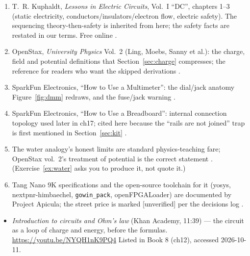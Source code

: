 \chapternotes

\begin{enumerate}
\item T.~R. Kuphaldt, \emph{Lessons in Electric Circuits}, Vol.~I ``DC'',
chapters 1--3 (static electricity, conductors/insulators/electron flow,
electric safety). The sequencing theory-then-safety is inherited from here;
the safety facts are restated in our terms. Free online
\cite{aacvol1}.
\item OpenStax, \emph{University Physics} Vol.~2 (Ling, Moebs, Sanny et
al.): the charge, field and potential definitions that
Section~\ref{sec:charge} compresses; the reference for readers who want the
skipped derivations \cite{openstaxv2}.
\item SparkFun Electronics, ``How to Use a Multimeter'': the dial/jack
anatomy Figure~\ref{fig:dmm} redraws, and the fuse/jack warning
\cite{sparkfunmultimeter}.
\item SparkFun Electronics, ``How to Use a Breadboard'': internal connection
topology used later in ch17; cited here because the ``rails are not joined''
trap is first mentioned in Section~\ref{sec:kit}
\cite{sparkfunbreadboard}.
\item The water analogy's honest limits are standard physics-teaching fare;
OpenStax vol.~2's treatment of potential is the correct statement
\cite{openstaxv2}. (Exercise~\ref{ex:water} asks you to produce it, not
quote it.)
\item Tang Nano 9K specifications and the open-source toolchain for it
(yosys, nextpnr-himbaechel, \texttt{gowin\_pack}, openFPGALoader) are
documented by Project Apicula; the street price is marked [unverified] per
the decisions log \cite{tangnano9k}.
\end{enumerate}

\begin{rulebox}
\begin{itemize}
\item \emph{Introduction to circuits and Ohm's law} (Khan Academy, 11:39) --- the circuit as a loop of charge and energy, before the formulas. \url{https://youtu.be/NYQH1nK9PQ4} Listed in Book 8 (ch12), accessed 2026-10-11.
\end{itemize}
\end{rulebox}

